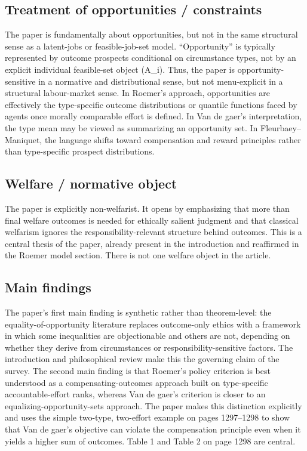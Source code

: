 \documentclass[11pt,a4paper]{article}
\begin{document}
\subsection*{Treatment of opportunities / constraints}
The paper is fundamentally about opportunities, but not in the same structural sense as a latent-jobs or feasible-job-set model. “Opportunity” is typically represented by outcome prospects conditional on circumstance types, not by an explicit individual feasible-set object (A\_i). Thus, the paper is opportunity-sensitive in a normative and distributional sense, but not menu-explicit in a structural labour-market sense. In Roemer’s approach, opportunities are effectively the type-specific outcome distributions or quantile functions faced by agents once morally comparable effort is defined. In Van de gaer’s interpretation, the type mean may be viewed as summarizing an opportunity set. In Fleurbaey–Maniquet, the language shifts toward compensation and reward principles rather than type-specific prospect distributions.

\subsection*{Welfare / normative object}
The paper is explicitly non-welfarist. It opens by emphasizing that more than final welfare outcomes is needed for ethically salient judgment and that classical welfarism ignores the responsibility-relevant structure behind outcomes. This is a central thesis of the paper, already present in the introduction and reaffirmed in the Roemer model section. There is not one welfare object in the article.

\subsection*{Main findings}
The paper’s first main finding is synthetic rather than theorem-level: the equality-of-opportunity literature replaces outcome-only ethics with a framework in which some inequalities are objectionable and others are not, depending on whether they derive from circumstances or responsibility-sensitive factors. The introduction and philosophical review make this the governing claim of the survey. The second main finding is that Roemer’s policy criterion is best understood as a compensating-outcomes approach built on type-specific accountable-effort ranks, whereas Van de gaer’s criterion is closer to an equalizing-opportunity-sets approach. The paper makes this distinction explicitly and uses the simple two-type, two-effort example on pages 1297–1298 to show that Van de gaer’s objective can violate the compensation principle even when it yields a higher sum of outcomes. Table 1 and Table 2 on page 1298 are central.
\end{document}
